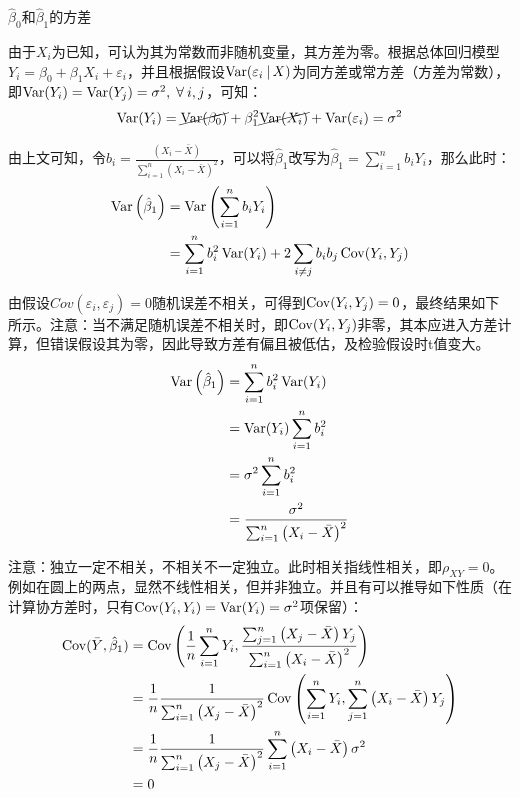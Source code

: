 \documentclass[11pt]{article}
\begin{document}
\begin{property}
    $\hat{\beta}_0$和$\hat{\beta}_1$的方差

    由于$X_i$为已知，可认为其为常数而非随机变量，其方差为零。根据总体回归模型$Y_i = \beta_0 + \beta_1 X_i + \varepsilon_i$，并且根据假设$\operatorname{Var}(\varepsilon_i \:\vert\, X)$为同方差或常方差（方差为常数），即$\Var(Y_i) = \Var(Y_j) = \sigma^2 \ilsep \forall i,j$，可知：
    \begin{equation*}
        \operatorname{Var}(Y_i) = \cancel{\operatorname{Var}(\beta_0)} + \beta_1^2 \cancel{\operatorname{Var}(X_i)} + \operatorname{Var}(\varepsilon_i) = \sigma^2
    \end{equation*}

    由上文可知，令$b_i = \frac{\left(X_i - \bar{X}\right)}{\sum_{i=1}^{n} \left(X_i - \bar{X}\right)^2}$，可以将$\hat{\beta}_1$改写为$\hat{\beta}_1 = \sum_{i=1}^{n} b_i Y_i$，那么此时：
    \begin{align*}
        \operatorname{Var}\left(\hat{\beta}_1\right) &= \operatorname{Var}\left( \sum_{i=1}^{n} b_i Y_i \right) \\
        &= \sum_{i=1}^{n} b_i^2 \operatorname{Var}(Y_i) + 2 \sum_{i\neq j} b_i b_j \operatorname{Cov}(Y_i,Y_j)
    \end{align*}

    由假设$Cov(\varepsilon_i,\varepsilon_j)=0$随机误差不相关，可得到$\operatorname{Cov}(Y_i,Y_j)=0$，最终结果如下所示。注意：当不满足随机误差不相关时，即$\operatorname{Cov}(Y_i,Y_j)$非零，其本应进入方差计算，但错误假设其为零，因此导致方差有偏且被低估，及检验假设时t值变大。
    \begin{align*}
        \operatorname{Var}\left(\hat{\beta}_1\right)
        &= \sum_{i=1}^{n} b_i^2 \operatorname{Var}(Y_i) \\
        &= \operatorname{Var}(Y_i) \sum_{i=1}^{n} b_i^2 \\
        &= \sigma^2 \sum_{i=1}^{n} b_i^2 \\
        &= \frac{\sigma^2}{\sum_{i=1}^{n} \left(X_i - \bar{X}\right)^2}
    \end{align*}

    注意：独立一定不相关，不相关不一定独立。此时相关指线性相关，即$\rho_{XY}=0$。例如在圆上的两点，显然不线性相关，但并非独立。并且有可以推导如下性质（在计算协方差时，只有$\operatorname{Cov}(Y_i,Y_i)=\operatorname{Var}(Y_i)=\sigma^2$项保留）：
    \begin{align*}
        \operatorname{Cov}(\bar{Y},\hat{\beta}_1)
        &= \operatorname{Cov} \left( \frac{1}{n} \sum_{i=1}^{n} Y_i, \frac{\sum_{j=1}^{n} \left(X_j - \bar{X}\right) Y_j}{\sum_{i=1}^{n} \left(X_i - \bar{X}\right)^2} \right) \\
        &= \frac{1}{n} \frac{1}{\sum_{i=1}^{n} \left(X_j - \bar{X}\right)^2} \operatorname{Cov} \left( \sum_{i=1}^{n} Y_i, \sum_{j=1}^{n} \left(X_i - \bar{X}\right) Y_j \right) \\
        &= \frac{1}{n} \frac{1}{\sum_{i=1}^{n} \left(X_j - \bar{X}\right)^2} \sum_{i=1}^{n} \left(X_i - \bar{X}\right) \sigma^2 \\
        &= 0
    \end{align*}


\end{property}
\end{document}

